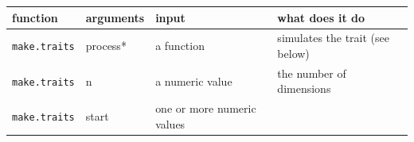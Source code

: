 \documentclass[
]{book}
\begin{document}
\begin{longtable}[]{@{}llll@{}}
\toprule
\begin{minipage}[b]{0.19\columnwidth}\raggedright
function\strut
\end{minipage} & \begin{minipage}[b]{0.23\columnwidth}\raggedright
arguments\strut
\end{minipage} & \begin{minipage}[b]{0.14\columnwidth}\raggedright
input\strut
\end{minipage} & \begin{minipage}[b]{0.33\columnwidth}\raggedright
what does it do\strut
\end{minipage}\tabularnewline
\midrule
\endhead
\begin{minipage}[t]{0.19\columnwidth}\raggedright
\texttt{make.traits}\strut
\end{minipage} & \begin{minipage}[t]{0.23\columnwidth}\raggedright
process*\strut
\end{minipage} & \begin{minipage}[t]{0.14\columnwidth}\raggedright
a function\strut
\end{minipage} & \begin{minipage}[t]{0.33\columnwidth}\raggedright
simulates the trait (see below)\strut
\end{minipage}\tabularnewline
\begin{minipage}[t]{0.19\columnwidth}\raggedright
\texttt{make.traits}\strut
\end{minipage} & \begin{minipage}[t]{0.23\columnwidth}\raggedright
n\strut
\end{minipage} & \begin{minipage}[t]{0.14\columnwidth}\raggedright
a numeric value\strut
\end{minipage} & \begin{minipage}[t]{0.33\columnwidth}\raggedright
the number of dimensions\strut
\end{minipage}\tabularnewline
\begin{minipage}[t]{0.19\columnwidth}\raggedright
\texttt{make.traits}\strut
\end{minipage} & \begin{minipage}[t]{0.23\columnwidth}\raggedright
start\strut
\end{minipage} & \begin{minipage}[t]{0.14\columnwidth}\raggedright
one or more numeric values\strut

\end{minipage}
\end{longtable}
\end{document}
